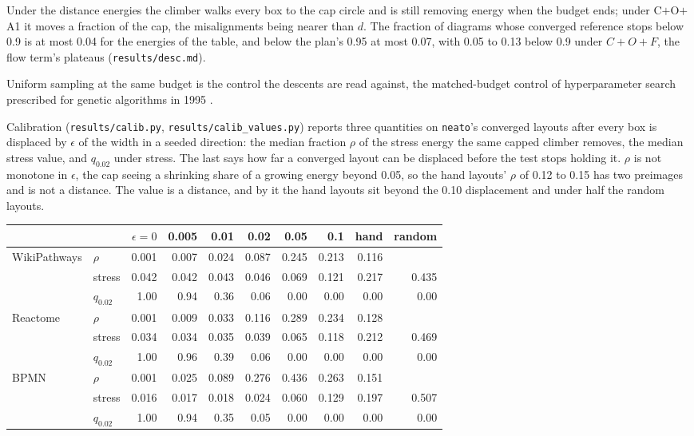 \documentclass[11pt]{article}
\begin{document}
Under the distance energies the climber walks every box to the cap circle and is still
removing energy when the budget ends; under C$+$O$+$A1 it moves a fraction of the cap,
the misalignments being nearer than $d$. The fraction of diagrams whose converged
reference stops below 0.9 is at most 0.04 for the energies of the table, and below the plan's 0.95 at most 0.07, with
0.05 to 0.13 below 0.9 under $C{+}O{+}F$, the flow term's plateaus
(\texttt{results/desc.md}).

Uniform sampling at the same budget is the control the descents are read against, the
matched-budget control of hyperparameter search \cite{bergstra12} prescribed for genetic
algorithms in 1995 \cite{jw95}.

Calibration (\texttt{results/calib.py}, \texttt{results/calib\_values.py}) reports three
quantities on \texttt{neato}'s converged layouts after every box is displaced by
$\epsilon$ of the width in a seeded direction: the median fraction $\rho$ of the stress
energy the same capped climber removes, the median stress value, and $q_{0.02}$ under
stress. The last says how far a converged layout can be displaced before the test stops
holding it. $\rho$ is not monotone in $\epsilon$, the cap seeing a shrinking share of a
growing energy beyond 0.05, so the hand layouts' $\rho$ of 0.12 to 0.15 has two preimages and is not a distance. The value is a distance, and by it the hand
layouts sit beyond the 0.10 displacement and under half the random layouts.

\begin{center}\footnotesize
\begin{tabular}{llrrrrrrrr}
\toprule
 & & $\epsilon = 0$ & 0.005 & 0.01 & 0.02 & 0.05 & 0.1 & hand & random \\
\midrule
WikiPathways & $\rho$ & 0.001 & 0.007 & 0.024 & 0.087 & 0.245 & 0.213 & 0.116 & \\
 & stress & 0.042 & 0.042 & 0.043 & 0.046 & 0.069 & 0.121 & 0.217 & 0.435 \\
 & $q_{0.02}$ & 1.00 & 0.94 & 0.36 & 0.06 & 0.00 & 0.00 & 0.00 & 0.00 \\
Reactome & $\rho$ & 0.001 & 0.009 & 0.033 & 0.116 & 0.289 & 0.234 & 0.128 & \\
 & stress & 0.034 & 0.034 & 0.035 & 0.039 & 0.065 & 0.118 & 0.212 & 0.469 \\
 & $q_{0.02}$ & 1.00 & 0.96 & 0.39 & 0.06 & 0.00 & 0.00 & 0.00 & 0.00 \\
BPMN & $\rho$ & 0.001 & 0.025 & 0.089 & 0.276 & 0.436 & 0.263 & 0.151 & \\
 & stress & 0.016 & 0.017 & 0.018 & 0.024 & 0.060 & 0.129 & 0.197 & 0.507 \\
 & $q_{0.02}$ & 1.00 & 0.94 & 0.35 & 0.05 & 0.00 & 0.00 & 0.00 & 0.00 \\
\bottomrule
\end{tabular}
\end{center}
\end{document}
